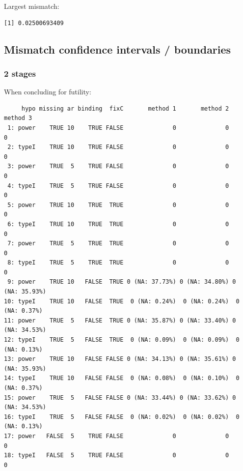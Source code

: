 \documentclass[12pt]{article}
\begin{document}
Largest mismatch:
\begin{verbatim}
[1] 0.02500693409
\end{verbatim}


\clearpage

\subsection{Mismatch confidence intervals / boundaries}
\label{sec:orgfbfcda5}

\subsubsection{2 stages}
\label{sec:orgdb92a7a}

When concluding for futility:
\begin{verbatim}
     hypo missing ar binding  fixC       method 1       method 2       method 3
 1: power    TRUE 10    TRUE FALSE              0              0              0
 2: typeI    TRUE 10    TRUE FALSE              0              0              0
 3: power    TRUE  5    TRUE FALSE              0              0              0
 4: typeI    TRUE  5    TRUE FALSE              0              0              0
 5: power    TRUE 10    TRUE  TRUE              0              0              0
 6: typeI    TRUE 10    TRUE  TRUE              0              0              0
 7: power    TRUE  5    TRUE  TRUE              0              0              0
 8: typeI    TRUE  5    TRUE  TRUE              0              0              0
 9: power    TRUE 10   FALSE  TRUE 0 (NA: 37.73%) 0 (NA: 34.80%) 0 (NA: 35.93%)
10: typeI    TRUE 10   FALSE  TRUE  0 (NA: 0.24%)  0 (NA: 0.24%)  0 (NA: 0.37%)
11: power    TRUE  5   FALSE  TRUE 0 (NA: 35.87%) 0 (NA: 33.40%) 0 (NA: 34.53%)
12: typeI    TRUE  5   FALSE  TRUE  0 (NA: 0.09%)  0 (NA: 0.09%)  0 (NA: 0.13%)
13: power    TRUE 10   FALSE FALSE 0 (NA: 34.13%) 0 (NA: 35.61%) 0 (NA: 35.93%)
14: typeI    TRUE 10   FALSE FALSE  0 (NA: 0.08%)  0 (NA: 0.10%)  0 (NA: 0.37%)
15: power    TRUE  5   FALSE FALSE 0 (NA: 33.44%) 0 (NA: 33.62%) 0 (NA: 34.53%)
16: typeI    TRUE  5   FALSE FALSE  0 (NA: 0.02%)  0 (NA: 0.02%)  0 (NA: 0.13%)
17: power   FALSE  5    TRUE FALSE              0              0              0
18: typeI   FALSE  5    TRUE FALSE              0              0              0
\end{verbatim}
\end{document}
